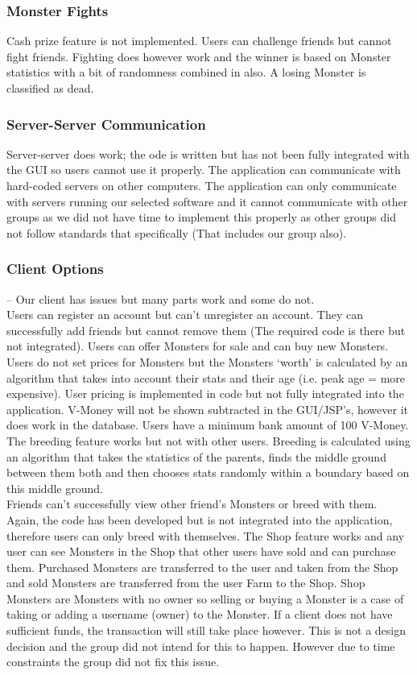 \documentclass[titlepage]{article}
\begin{document}
{\subsubsection {Monster Fights}
Cash prize feature is not implemented. Users can challenge friends but cannot fight friends. Fighting does however work and the winner is based on Monster statistics with a bit of randomness combined in also. A losing Monster is classified as dead.

\subsubsection{Server-Server Communication}
Server-server does work;  the ode is written but has not been fully integrated with the GUI so users cannot use it properly. The application can communicate with hard-coded servers on other computers. The application can only communicate with servers running our selected software and it cannot communicate with other groups as we did not have time to implement this properly as other groups did not follow standards that specifically (That includes our group also).

\subsubsection{Client Options} – Our client has issues but many parts work and some do not.
\\
Users can register an account but can't unregister an account. They can successfully add friends but cannot remove them (The required code is there but not integrated). Users can offer Monsters for sale and can buy new Monsters. Users do not set prices for Monsters but the Monsters ‘worth’ is calculated by an algorithm that takes into account their stats and their age (i.e. peak age = more expensive). User pricing is implemented in code but not fully integrated into the application. V-Money will not be shown subtracted in the GUI/JSP’s, however it does work in the database. Users have a minimum bank amount of 100 V-Money.
The breeding feature works but not with other users. Breeding is calculated using an algorithm that takes the statistics of the parents, finds the middle ground between them both and then chooses stats randomly within a boundary based on this middle ground.
\\
Friends can't successfully view other friend’s Monsters or breed with them. Again, the code has been developed but is not integrated into the application, therefore users can only breed with themselves. The Shop feature works and any user can see Monsters in the Shop that other users have sold and can purchase them. Purchased Monsters are transferred to the user and taken from the Shop and sold Monsters are transferred from the user Farm to the Shop. Shop Monsters are Monsters with no owner so selling or buying a Monster is a case of taking or adding a username (owner) to the Monster.
If a client does not have sufficient funds, the transaction will still take place however. This is not a design decision and the group did not intend for this to happen. However due to time constraints the group did not fix this issue.

}
\end{document}
